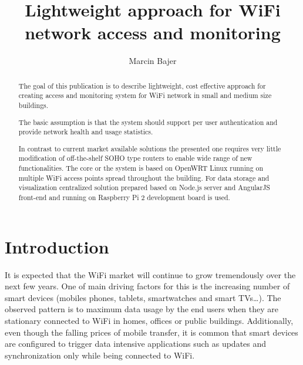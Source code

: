 \documentclass{llncs}
\begin{document}
\frontmatter          %

\pagestyle{headings}  %
\mainmatter              %
\title{Lightweight approach for WiFi network access and monitoring}
\author{Marcin Bajer}

%

\maketitle              %

\begin{abstract}
The goal of this publication is to describe lightweight, cost effective approach
for creating access and monitoring system for WiFi network in small and medium
size buildings.

The basic assumption is that the system should support per user
authentication and provide network health and usage statistics.

In contrast to current market available solutions the presented one requires
very little modification of off-the-shelf SOHO type routers to enable wide
range of new functionalities. The core or the system is based on OpenWRT Linux running
on multiple WiFi access points spread throughout the building.
For data storage and visualization centralized solution prepared
based on Node.js server and AngularJS front-end and running on Raspberry Pi 2
development board is used. 

\end{abstract}
%
\section{Introduction}
%

It is expected that the WiFi market will continue to grow tremendously over the
next few years. One of main driving factors for this is the increasing number of
smart devices (mobiles phones, tablets, smartwatches and smart TVs\ldots). The
observed pattern is to maximum data usage by the end users when they are
stationary connected to WiFi in homes, offices or public buildings.
Additionally, even though the falling prices of mobile transfer, it is common that
smart devices are configured to trigger data intensive applications such as
updates and synchronization only while being connected to WiFi.
\end{document}
